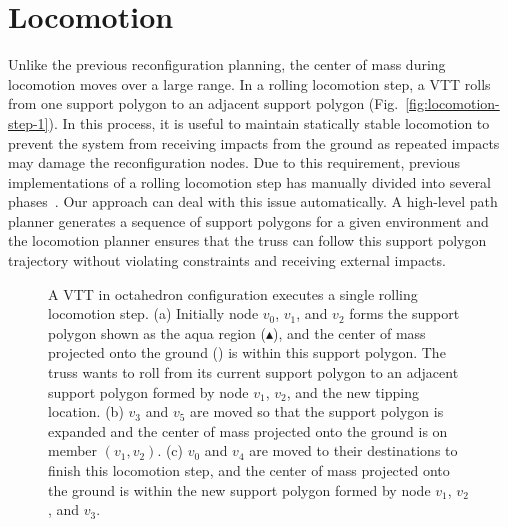 \documentclass[journal]{IEEEtran}
\begin{document}
\section{Locomotion}
\label{sec:locomotion}

Unlike the previous reconfiguration planning, the center of mass
during locomotion moves over a large range. In a rolling locomotion
step, a VTT rolls from one support polygon to an adjacent support
polygon (Fig.~\ref{fig:locomotion-step-1}). In this process, it is
useful to maintain statically stable locomotion to prevent the system
from receiving impacts from the ground as repeated impacts may damage
the reconfiguration nodes. Due to this requirement, previous
implementations of a rolling locomotion step has manually divided into
several
phases~\cite{Park-vtt-locomotion-ral-2020,Usevitch-lar-locomotion-tro-2020}. Our
approach can deal with this issue automatically. A high-level path
planner generates a sequence of support polygons for a given
environment and the locomotion planner ensures that the truss can
follow this support polygon trajectory without violating constraints
and receiving external impacts.

\begin{figure}[t]
  \centering
  \hfil
  \hfil
  \caption{A VTT in octahedron configuration executes a single rolling
    locomotion step. (a) Initially node $v_0$, $v_1$, and $v_2$ forms
    the support polygon shown as the aqua region
    ({\color[rgb]{0,1,1}$\blacktriangle$}), and the center of mass
    projected onto the ground ({\color{green}{$\bullet$}}) is within
    this support polygon. The truss wants to roll from its current
    support polygon to an adjacent support polygon formed by node
    $v_1$, $v_2$, and the new tipping location. (b) $v_3$ and $v_5$
    are moved so that the support polygon is expanded and the center
    of mass projected onto the ground is on member $(v_1, v_2)$. (c)
    $v_0$ and $v_4$ are moved to their destinations to finish this
    locomotion step, and the center of mass projected onto the ground
    is within the new support polygon formed by node $v_1$, $v_2$, and
    $v_3$.}
  \label{fig:single-step-locomotion}
\end{figure}
\end{document}
